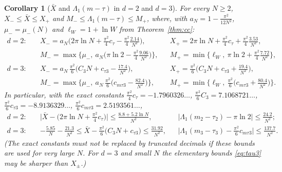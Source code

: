 \documentclass[11pt,a4paper]{article}
\newcommand{\Xb}{\bar X}
\theoremstyle{plain}
\newtheorem{corollary}[theorem]{Corollary}
\theoremstyle{definition}
\numberwithin{equation}{section}
\begin{document}
\begin{corollary}[$\Xb$ and $\Lambda_1(m-\tau)$ in $d=2$ and $d=3$]\label{cor:Xbar}
For every $N\ge2$, $X_-\le\Xb\le X_+$ and $M_-\le\Lambda_1(m-\tau)\le M_+$, where, with $a_N=1-\frac{\pi^2}{12N^2}$, $\mu_-=\mu_-(N)$ and $\ell_W=1+\ln W$ from Theorem~\ref{thm:cc}:
\begin{align*}
d=2:\quad&X_-=a_N\Big(2\pi\ln N+\tfrac{\pi^2}4c_\tau-\tfrac{\pi^2}{4}\tfrac{2.14}{N^2}\Big),&&X_+=2\pi\ln N+\tfrac{\pi^2}4c_\tau+\tfrac{\pi^2}4\tfrac{3.53}{N^2},\\
&M_-=\max\Big\{\mu_-,\ a_N\Big(\pi\ln2-\tfrac{\pi^2}{4}\tfrac{9.06}{N^2}\Big)\Big\},&&M_+=\min\Big\{\ell_W,\ \pi\ln2+\tfrac{\pi^2}{4}\tfrac{7.72}{N^2}\Big\},\\
d=3:\quad&X_-=a_N\,\tfrac{\pi^2}{6}\Big(C_3N+c_{\tau3}-\tfrac{17.4}{N^2}\Big),&&X_+=\tfrac{\pi^2}6\Big(C_3N+c_{\tau3}+\tfrac{19.4}{N^2}\Big),\\
&M_-=\max\Big\{\mu_-,\ a_N\,\tfrac{\pi^2}{6}\Big(c_{m\tau3}-\tfrac{82.4}{N^2}\Big)\Big\},&&M_+=\min\Big\{\ell_W,\ \tfrac{\pi^2}{6}\Big(c_{m\tau3}+\tfrac{80.4}{N^2}\Big)\Big\}.
\end{align*}
In particular, with the exact constants $\frac{\pi^2}{4}c_\tau=-1.7960326\ldots$, $\frac{\pi^2}6C_3=7.1068721\ldots$, $\frac{\pi^2}{6}c_{\tau3}=-8.9136329\ldots$, $\frac{\pi^2}6c_{m\tau3}=2.5193561\ldots$,
\[
\begin{aligned}d=2:\quad&\Big|\Xb-\big(2\pi\ln N+\tfrac{\pi^2}{4}c_\tau\big)\Big|\le\frac{8.8+5.2\ln N}{N^2},&&\big|\Lambda_1(m_2-\tau_2)-\pi\ln2\big|\le\frac{24.2}{N^2};\\
d=3:\quad&-\frac{5.85}{N}-\frac{21.3}{N^2}\le\Xb-\tfrac{\pi^2}{6}\big(C_3N+c_{\tau3}\big)\le\frac{31.92}{N^2},&&\big|\Lambda_1(m_3-\tau_3)-\tfrac{\pi^2}{6}c_{m\tau3}\big|\le\frac{137.7}{N^2}.\end{aligned}
\]
(The exact constants must not be replaced by truncated decimals if these bounds are used for very large $N$. For $d=3$ and small $N$ the elementary bounds \eqref{eq:tau3} may be sharper than $X_\pm$.)
\end{corollary}
\end{document}
